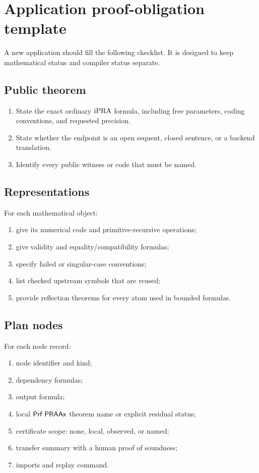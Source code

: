 \section{Application proof-obligation template}
\label{app:obligations}

A new application should fill the following checklist.  It is designed to keep
mathematical status and compiler status separate.

\subsection{Public theorem}

\begin{enumerate}
  \item State the exact ordinary \(\mathrm{iPRA}\) formula, including free parameters,
        coding conventions, and requested precision.
  \item State whether the endpoint is an open sequent, closed sentence, or a
        backend translation.
  \item Identify every public witness or code that must be named.
\end{enumerate}

\subsection{Representations}

For each mathematical object:
\begin{enumerate}
  \item give its numerical code and primitive-recursive operations;
  \item give validity and equality/compatibility formulas;
  \item specify failed or singular-case conventions;
  \item list checked upstream symbols that are reused;
  \item provide reflection theorems for every atom used in bounded formulas.
\end{enumerate}

\subsection{Plan nodes}

For each node record:
\begin{enumerate}
  \item node identifier and kind;
  \item dependency formulas;
  \item output formula;
  \item local \(\mathsf{Prf}\;\mathsf{PRAAx}\) theorem name or explicit residual status;
  \item certificate scope: none, local, observed, or named;
  \item transfer summary with a human proof of soundness;
  \item imports and replay command.
\end{enumerate}


